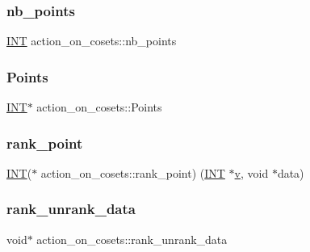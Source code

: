 \subsubsection{\texorpdfstring{nb\+\_\+points}{nb\_points}}
{\footnotesize\ttfamily \mbox{\hyperlink{galois_8h_a09fddde158a3a20bd2dcadb609de11dc}{I\+NT}} action\+\_\+on\+\_\+cosets\+::nb\+\_\+points}

\mbox{\label{classaction__on__cosets_a692e4bffcc20dd5b966a7cc8847c8272}} 
\subsubsection{\texorpdfstring{Points}{Points}}
{\footnotesize\ttfamily \mbox{\hyperlink{galois_8h_a09fddde158a3a20bd2dcadb609de11dc}{I\+NT}}$\ast$ action\+\_\+on\+\_\+cosets\+::\+Points}

\mbox{\label{classaction__on__cosets_ab7d62bbeaba4773bc38f9fca642089e0}} 
\subsubsection{\texorpdfstring{rank\+\_\+point}{rank\_point}}
{\footnotesize\ttfamily \mbox{\hyperlink{galois_8h_a09fddde158a3a20bd2dcadb609de11dc}{I\+NT}}($\ast$ action\+\_\+on\+\_\+cosets\+::rank\+\_\+point) (\mbox{\hyperlink{galois_8h_a09fddde158a3a20bd2dcadb609de11dc}{I\+NT}} $\ast$\mbox{\hyperlink{simeon_8_c_aeb3f3030944801b163bc3b829a7f6710}{v}}, void $\ast$data)}

\mbox{\label{classaction__on__cosets_ae5027b43d2e97332830324527098623d}} 
\subsubsection{\texorpdfstring{rank\+\_\+unrank\+\_\+data}{rank\_unrank\_data}}
{\footnotesize\ttfamily void$\ast$ action\+\_\+on\+\_\+cosets\+::rank\+\_\+unrank\+\_\+data}

